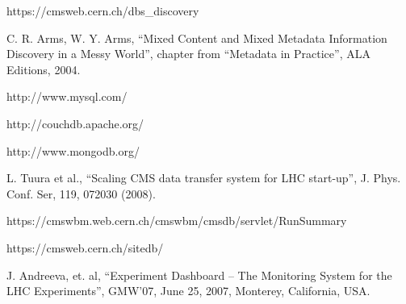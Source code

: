 \documentclass[1p,times]{elsarticle}
\begin{document}
\begin{thebibliography}{00}
 https://cmsweb.cern.ch/dbs\_discovery

C. R. Arms, W. Y. Arms,
 ``Mixed Content and Mixed Metadata 
Information Discovery in a Messy World'',
chapter from ``Metadata in Practice'', ALA Editions, 2004.

http://www.mysql.com/

http://couchdb.apache.org/

http://www.mongodb.org/


L. Tuura et al., 
``Scaling CMS data transfer system for LHC start-up'', 
J. Phys. Conf. Ser, 119, 072030 (2008).

https://cmswbm.web.cern.ch/cmswbm/cmsdb/servlet/RunSummary

https://cmsweb.cern.ch/sitedb/




J. Andreeva, et. al,
``Experiment Dashboard – The Monitoring System for the LHC Experiments'',
GMW’07, June 25, 2007, Monterey, California, USA.



\end{thebibliography}
\end{document}
